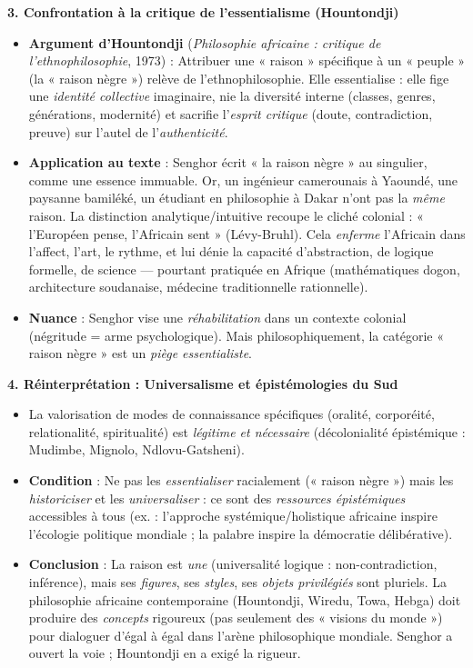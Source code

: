 \documentclass[11pt]{article}
\newcommand{\cle}[1]{{\popxbold\color{popdark}#1}}
\begin{document}
\begin{corrige}
\textbf{3. Confrontation à la critique de l'essentialisme (Hountondji)}\par
\begin{itemize}
\item \textbf{Argument d'Hountondji} (\emph{Philosophie africaine : critique de l'ethnophilosophie}, 1973) : Attribuer une « raison » spécifique à un « peuple » (la « raison nègre ») relève de l'\cle{ethnophilosophie}. Elle essentialise : elle fige une \emph{identité collective} imaginaire, nie la diversité interne (classes, genres, générations, modernité) et sacrifie l'\emph{esprit critique} (doute, contradiction, preuve) sur l'autel de l'\emph{authenticité}.
\item \textbf{Application au texte} : Senghor écrit « la raison nègre » au singulier, comme une essence immuable. Or, un ingénieur camerounais à Yaoundé, une paysanne bamiléké, un étudiant en philosophie à Dakar n'ont pas la \emph{même} raison. La distinction analytique/intuitive recoupe le cliché colonial : « l'Européen pense, l'Africain sent » (Lévy-Bruhl). Cela \emph{enferme} l'Africain dans l'affect, l'art, le rythme, et lui dénie la capacité d'abstraction, de logique formelle, de science — pourtant pratiquée en Afrique (mathématiques dogon, architecture soudanaise, médecine traditionnelle rationnelle).
\item \textbf{Nuance} : Senghor vise une \emph{réhabilitation} dans un contexte colonial (négritude = arme psychologique). Mais philosophiquement, la catégorie « raison nègre » est un \emph{piège essentialiste}.
\end{itemize}

\textbf{4. Réinterprétation : Universalisme et épistémologies du Sud}\par
\begin{itemize}
\item La valorisation de modes de connaissance spécifiques (oralité, corporéité, relationalité, spiritualité) est \emph{légitime et nécessaire} (décolonialité épistémique : Mudimbe, Mignolo, Ndlovu-Gatsheni).
\item \textbf{Condition} : Ne pas les \emph{essentialiser} racialement (« raison nègre ») mais les \emph{historiciser} et les \emph{universaliser} : ce sont des \emph{ressources épistémiques} accessibles à tous (ex. : l'approche systémique/holistique africaine inspire l'écologie politique mondiale ; la palabre inspire la démocratie délibérative).
\item \textbf{Conclusion} : La raison est \emph{une} (universalité logique : non-contradiction, inférence), mais ses \emph{figures}, ses \emph{styles}, ses \emph{objets privilégiés} sont pluriels. La philosophie africaine contemporaine (Hountondji, Wiredu, Towa, Hebga) doit produire des \emph{concepts} rigoureux (pas seulement des « visions du monde ») pour dialoguer d'égal à égal dans l'arène philosophique mondiale. Senghor a ouvert la voie ; Hountondji en a exigé la rigueur.
\end{itemize}


\end{corrige}
\end{document}
